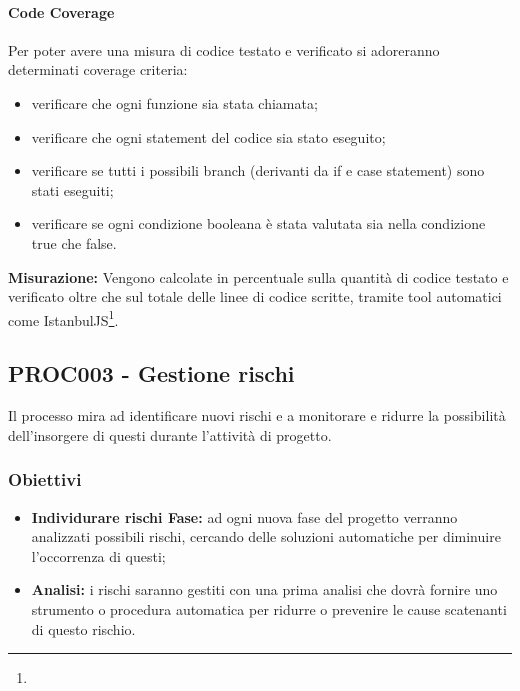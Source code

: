 \documentclass[PianoDiQualifica.tex]{subfiles}
\begin{document}
\paragraph{Code Coverage}
Per poter avere una misura di codice testato e verificato si adoreranno determinati coverage criteria:
\begin{itemize}%
	\item {} verificare che ogni funzione sia stata chiamata;
	\item {} verificare che ogni statement del codice sia stato eseguito; 
	\item {} verificare se tutti i possibili branch (derivanti da if e case statement) sono stati eseguiti;
	\item {} verificare se ogni condizione booleana è stata valutata sia nella condizione true che false. 
\end{itemize}

\textbf{Misurazione:}
Vengono calcolate in percentuale sulla quantità di codice testato e verificato oltre che sul totale delle linee di codice scritte, tramite tool automatici come IstanbulJS\footnote{}.


\subsection{PROC003 - Gestione rischi}
Il processo mira ad identificare nuovi rischi e a monitorare e ridurre la possibilità dell'insorgere di questi durante l'attività di progetto.
\subsubsection{Obiettivi}
\begin{itemize}
	\item \textbf{Individurare rischi Fase:} ad ogni nuova fase del progetto verranno analizzati possibili rischi, cercando delle soluzioni automatiche per diminuire l'occorrenza di questi;
	\item \textbf{Analisi:} i rischi saranno gestiti con una prima analisi che dovrà fornire uno strumento o procedura automatica per ridurre o prevenire le cause scatenanti di questo rischio.
\end{itemize}
\end{document}
